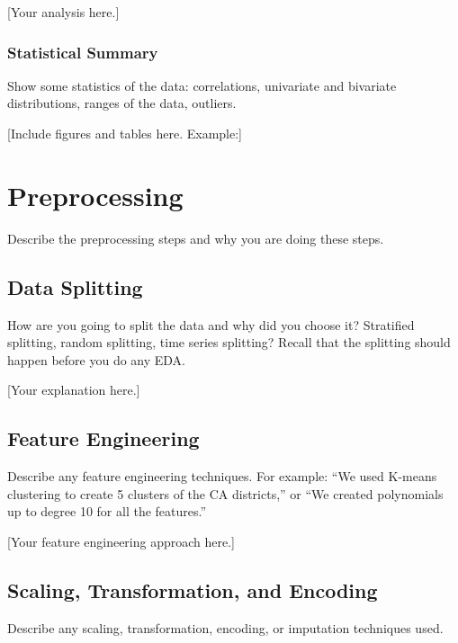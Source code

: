 \documentclass[aps,prl,preprint,groupedaddress]{revtex4-2}
\begin{document}
[Your analysis here.]

\subsubsection{Statistical Summary}
Show some statistics of the data: correlations, univariate and bivariate distributions, ranges of the data, outliers.

[Include figures and tables here. Example:]

\section{Preprocessing}
\label{sec:preprocessing}

Describe the preprocessing steps and why you are doing these steps.

\subsection{Data Splitting}
How are you going to split the data and why did you choose it? Stratified splitting, random splitting, time series splitting? Recall that the splitting should happen before you do any EDA.

[Your explanation here.]

\subsection{Feature Engineering}
Describe any feature engineering techniques. For example: ``We used K-means clustering to create 5 clusters of the CA districts,'' or ``We created polynomials up to degree 10 for all the features.''

[Your feature engineering approach here.]

\subsection{Scaling, Transformation, and Encoding}
Describe any scaling, transformation, encoding, or imputation techniques used.
\end{document}

